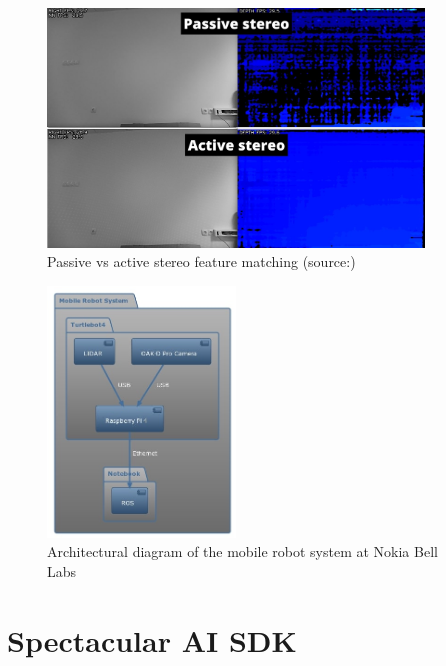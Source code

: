 \begin{figure}[htbp]
    \centering
    \includegraphics[width=100mm, keepaspectratio]{figures_jpg/active-vs-passive-stereo.jpg}
    \caption{Passive vs active stereo feature matching (source:\cite{ActivePassiveStereo})}
    \label{fig:active-passive-stereo}
\end{figure}

\begin{figure}[htbp]
    \centering
    \includegraphics[width=50mm, keepaspectratio]{figures_jpg/turtlebot4_architecture.jpg}
    \caption{Architectural diagram of the mobile robot system at Nokia Bell Labs}
    \label{fig:mobile_robot_architecture}
\end{figure}

\FloatBarrier
\section{Spectacular AI SDK}

